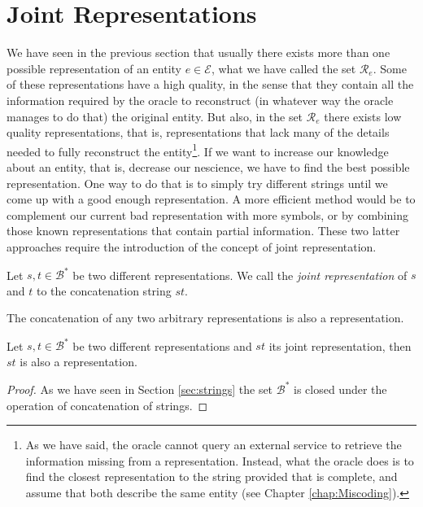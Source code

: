 %
%

\section{Joint Representations}
\label{sec:descriptions_joint_topic}

We have seen in the previous section that usually there exists more than one possible representation of an entity $e \in \mathcal{E}$, what we have called the set $\mathcal{R}_e$. Some of these representations have a high quality, in the sense that they contain all the information required by the oracle to reconstruct (in whatever way the oracle manages to do that) the original entity. But also, in the set $\mathcal{R}_e$ there exists low quality representations, that is, representations that lack many of the details needed to fully reconstruct the entity\footnote{As we have said, the oracle cannot query an external service to retrieve the information missing from a representation. Instead, what the oracle does is to find the closest representation to the string provided that is complete, and assume that both describe the same entity (see Chapter \ref{chap:Miscoding}).}. If we want to increase our knowledge about an entity, that is, decrease our nescience, we have to find the best possible representation. One way to do that is to simply try different strings until we come up with a good enough representation. A more efficient method would be to complement our current bad representation with more symbols, or by combining those known representations that contain partial information. These two latter approaches require the introduction of the concept of joint representation.

\begin{definition}
Let $s, t \in \mathcal{B}^\ast$ be two different representations. We call the \emph{joint representation} of $s$ and $t$ to the concatenation string $st$.
\end{definition}

The concatenation of any two arbitrary representations is also a representation.

\begin{proposition}
Let $s, t \in \mathcal{B}^\ast$ be two different representations and $st$ its joint representation, then $st$ is also a representation.
\end{proposition}
\begin{proof}
As we have seen in Section \ref{sec:strings} the set $\mathcal{B}^\ast$ is closed under the operation of concatenation of strings.
\end{proof}

